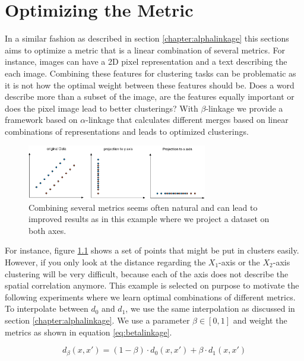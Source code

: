 \chapter{Optimizing the Metric}
\label{sec:beta}

In a similar fashion as described in section \ref{chapter:alphalinkage} this sections aims to optimize a metric that is a linear combination of several metrics. For instance, images can have a 2D pixel representation and a text describing the each image. Combining these features for clustering tasks can be problematic as it is not how the optimal weight between these features should be. Does a word describe more than a subset of the image, are the features equally important or does the pixel image lead to better clusterings? With $\beta$-linkage we provide a framework based on $\alpha$-linkage that calculates different merges based on linear combinations of representations and leads to optimized clusterings.

\begin{figure}[h]
    \centering
    \includegraphics[width=0.7\textwidth]{images/ExampleDataset}
    \caption{Combining several metrics seems often natural and can lead to improved results as in this example where we project a dataset on both axes.}
    \label{fig:metrics}
\end{figure}

For instance, figure \ref{fig:metrics} shows a set of points that might be put in clusters easily. However, if you only look at the distance regarding the $X_1$-axis or the $X_2$-axis clustering will be very difficult, because each of the axis does not describe the spatial correlation anymore. This example is selected on purpose to motivate the following experiments where we learn optimal combinations of different metrics.\\ 

To interpolate between $d_0$ and $d_1$, we use the same interpolation as discussed in section \ref{chapter:alphalinkage}. We use a parameter $\beta \in [0,1]$ and weight the metrics as shown in equation \ref{eq:betalinkage}.

\begin{equation}
d_\beta(x,x') = (1 - \beta) \cdot d_0(x,x') + \beta \cdot d_1(x,x')
\label{eq:betalinkage}
\end{equation}

